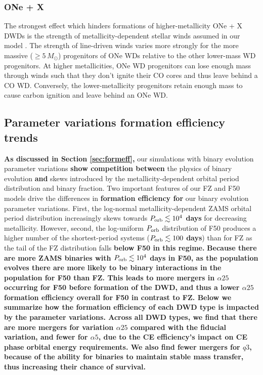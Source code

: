 \documentclass[twocolumn]{aastex631}
\begin{document}
\subsubsection{\textbf{ONe + X}}\label{formeff_ONe}
The strongest effect which hinders formations of higher-metallicity ONe + X DWDs is the strength of metallicity-dependent stellar winds assumed in our model \citep{Vink2001}. The strength of line-driven winds varies more strongly for the more massive ($\geq5\,M_\odot$) progenitors of ONe WDs relative to the other lower-mass WD progenitors. At higher metallicities, ONe WD progenitors can lose enough mass through winds such that they don't ignite their CO cores and thus leave behind a CO WD. Conversely, the lower-metallicity progenitors retain enough mass to cause carbon ignition and leave behind an ONe WD. 


\subsection{Parameter variations formation efficiency trends}\label{subsec:formeff_vars}

\textbf{As discussed in Section \ref{sec:formeff},} our simulations with binary evolution parameter variations \textbf{show competition between} the physics of binary evolution \textbf{and} skews introduced by the metallicity-dependent orbital period distribution and binary fraction. Two important features of our FZ and F50 models drive the differences in \textbf{formation efficiency for} our binary evolution parameter variations. First, the log-normal metallicity-dependent ZAMS orbital period distribution increasingly skews towards \textbf{$P_{\rm{orb}}\lesssim 10^4$ days} for decreasing metallicity. However, second, the log-uniform $P_{\rm{orb}}$ distribution of F50 produces a higher number of the shortest-period systems (\textbf{$P_{\rm{orb}}\lesssim 100$ days}) than for FZ as the tail of the FZ distribution falls \textbf{below F50 in this regime.} \textbf{Because there are more ZAMS binaries with $P_{\rm{orb}} \lesssim 10^4$ days in F50, as the population evolves there are more likely to be binary interactions in the population for F50 than FZ. This leads to more mergers in $\alpha25$ occurring for F50 before formation of the DWD, and thus a lower $\alpha25$ formation efficiency overall for F50 in contrast to FZ. Below we summarize how the formation efficiency of each DWD type is impacted by the parameter variations. Across all DWD types, we find that there are more mergers for variation $\alpha25$ compared with the fiducial variation, and fewer for $\alpha5$, due to the CE efficiency's impact on CE phase orbital energy requirements. We also find fewer mergers for $q3$, because of the ability for binaries to maintain stable mass transfer, thus increasing their chance of survival.}
\end{document}
